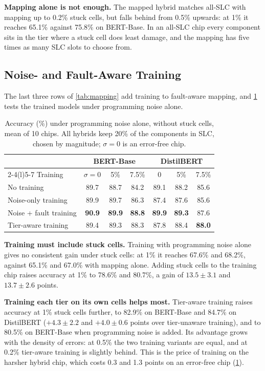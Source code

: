 \textbf{Mapping alone is not enough.} The mapped hybrid matches all-SLC with mapping up to 0.2\% stuck
cells, but falls behind from 0.5\% upwards: at 1\% it reaches 65.1\% against 75.8\% on BERT-Base. In an
all-SLC chip every component sits in the tier where a stuck cell does least damage, and the mapping has
five times as many SLC slots to choose from.

\subsection{Noise- and Fault-Aware Training}
The last three rows of \cref{tab:mapping} add training to fault-aware mapping, and \cref{tab:trainnoise}
tests the trained models under programming noise alone.

\begin{table}[t]
\centering\footnotesize
\caption{Accuracy (\%) under programming noise alone, without stuck cells, mean of 10 chips. All hybrids
keep 20\% of the components in SLC, chosen by magnitude; $\sigma=0$ is an error-free chip.}\label{tab:trainnoise}
\setlength{\tabcolsep}{4pt}
\begin{tabular}{@{}lccc@{\hskip 10pt}ccc@{}}
\toprule
& \multicolumn{3}{c}{BERT-Base} & \multicolumn{3}{c}{DistilBERT} \\
\cmidrule(lr){2-4}\cmidrule(l){5-7}
Training & $\sigma=0$ & 5\% & 7.5\% & 0 & 5\% & 7.5\% \\
\midrule
No training       & 89.7 & 88.7 & 84.2 & 89.1 & 88.2 & 85.6 \\
Noise-only training & 89.9 & 89.7 & 86.3 & 87.4 & 87.6 & 85.6 \\
Noise + fault training & \textbf{90.9} & \textbf{89.9} & \textbf{88.8} & \textbf{89.9} & \textbf{89.3} & 87.6 \\
Tier-aware training & 89.4 & 89.3 & 88.3 & 87.8 & 88.4 & \textbf{88.0} \\
\bottomrule
\end{tabular}
\end{table}

\textbf{Training must include stuck cells.} Training with programming noise alone gives no consistent gain
under stuck cells: at 1\% it reaches 67.6\% and 68.2\%, against 65.1\% and 67.0\% with mapping alone.
Adding stuck cells to the training chip raises accuracy at 1\% to 78.6\% and 80.7\%, a gain of
$13.5\pm3.1$ and $13.7\pm2.6$ points.

\textbf{Training each tier on its own cells helps most.} Tier-aware training raises accuracy at 1\% stuck
cells further, to 82.9\% on BERT-Base and 84.7\% on DistilBERT ($+4.3\pm2.2$ and $+4.0\pm0.6$ points over
tier-unaware training), and to 80.5\% on BERT-Base when programming noise is added. Its advantage grows
with the density of errors: at 0.5\% the two training variants are equal, and at 0.2\% tier-aware training
is slightly behind. This is the price of training on the harsher hybrid chip, which costs 0.3 and 1.3
points on an error-free chip (\cref{tab:trainnoise}).

